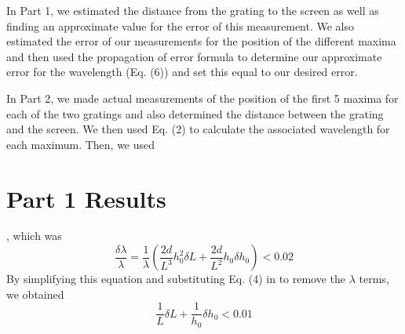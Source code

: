 \documentclass[leqno]{article}
\begin{document}
\noindent In Part 1, we estimated the distance from the grating to the screen as well as finding an approximate value for the error of this measurement.  We also estimated the error of our measurements for the position of the different maxima and then used the propagation of error formula to determine our approximate error for the wavelength (Eq. (6)) and set this equal to our desired error.

\noindent In Part 2, we made actual measurements of the position of the first 5 maxima for each of the two gratings and also determined the distance between the grating and the screen.  We then used Eq. (2) to calculate the associated wavelength for each maximum.  Then, we used
\section*{Part 1 Results}
, which was 
\begin{equation*}
	\frac{\delta \lambda}{\lambda}=\frac{1}{\lambda}(\frac{2d}{L^3}h_0^2  \delta L+\frac{2d}{L^2}h_0  \delta h_0)<0.02
\end{equation*}
By simplifying this equation and substituting Eq. (4) in to remove the $\lambda$ terms, we obtained
\begin{equation*}
	\frac{1}{L} \delta L + \frac{1}{h_0} \delta h_0 < 0.01
\end{equation*}
\end{document}

